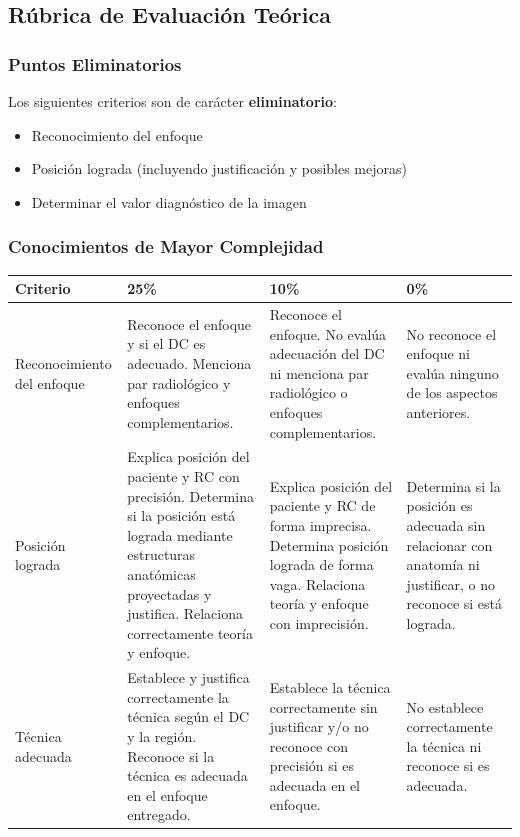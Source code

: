 \clearpage

\subsection*{Rúbrica de Evaluación Teórica}

\subsubsection*{Puntos Eliminatorios}

Los siguientes criterios son de carácter \textbf{eliminatorio}:

\begin{itemize}
    \item Reconocimiento del enfoque
    \item Posición lograda (incluyendo justificación y posibles mejoras)
    \item Determinar el valor diagnóstico de la imagen
\end{itemize}

\subsubsection*{Conocimientos de Mayor Complejidad}

\begin{table}[h]
\centering
\renewcommand{\arraystretch}{1.5}
\begin{tabular}{|p{3cm}|p{4.5cm}|p{4.5cm}|p{3.5cm}|}
\hline
\textbf{Criterio} & \textbf{25\%} & \textbf{10\%} & \textbf{0\%} \\
\hline
Reconocimiento del enfoque &
Reconoce el enfoque y si el DC es adecuado. Menciona par radiológico y enfoques complementarios. &
Reconoce el enfoque. No evalúa adecuación del DC ni menciona par radiológico o enfoques complementarios. &
No reconoce el enfoque ni evalúa ninguno de los aspectos anteriores. \\
\hline
Posición lograda &
Explica posición del paciente y RC con precisión. Determina si la posición está lograda mediante estructuras anatómicas proyectadas y justifica. Relaciona correctamente teoría y enfoque. &
Explica posición del paciente y RC de forma imprecisa. Determina posición lograda de forma vaga. Relaciona teoría y enfoque con imprecisión. &
Determina si la posición es adecuada sin relacionar con anatomía ni justificar, o no reconoce si está lograda. \\
\hline
Técnica adecuada &
Establece y justifica correctamente la técnica según el DC y la región. Reconoce si la técnica es adecuada en el enfoque entregado. &
Establece la técnica correctamente sin justificar y/o no reconoce con precisión si es adecuada en el enfoque. &
No establece correctamente la técnica ni reconoce si es adecuada. \\
\hline
\end{tabular}
\end{table}

